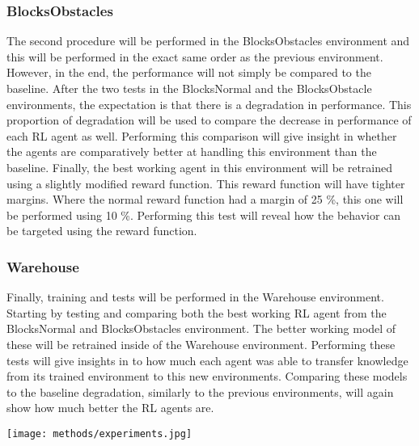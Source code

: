 \subsubsection{BlocksObstacles}
The second procedure will be performed in the BlocksObstacles environment and this 
will be performed in the exact same order as the previous environment. However, in the end, 
the performance will not simply be compared to the baseline. After the two tests in the 
BlocksNormal and the BlocksObstacle environments, the expectation is that there is a 
degradation in performance. This proportion of degradation will be used to compare the 
decrease in performance of each RL agent as well. Performing this comparison will give insight 
in whether the agents are comparatively better at handling this environment than the baseline. 
Finally, the best working agent in this environment will be retrained using a slightly modified 
reward function. This reward function will have tighter margins. Where the normal reward function 
had a margin of 25 \%, this one will be performed using 10 \%. Performing this test will 
reveal how the behavior can be targeted using the reward function. 

\subsubsection{Warehouse}
Finally, training and tests will be performed in the Warehouse environment. Starting by 
testing and comparing both the best working RL agent from the BlocksNormal and BlocksObstacles 
environment. The better working model of these will be retrained inside of the Warehouse environment. 
Performing these tests will give insights in to how much each agent was able to transfer knowledge from 
its trained environment to this new environments. Comparing these models to the baseline degradation, 
similarly to the previous environments, will again show how much better the RL agents are. 

\begin{Figure}
    \centering
    \texttt{[image: methods/experiments.jpg]}
    \label{im:experiments}
\end{Figure}
